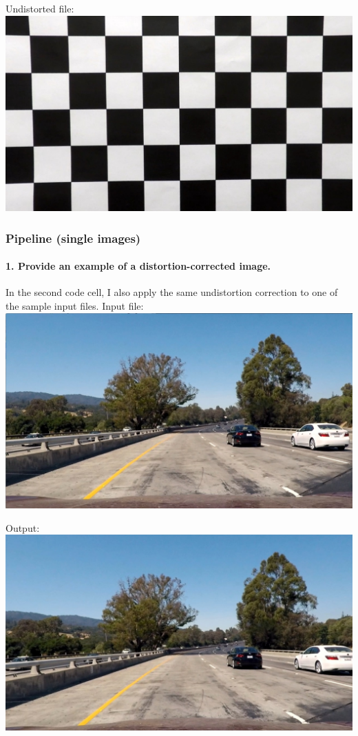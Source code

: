 \documentclass[11pt]{article}
\makeatletter
\def\maxwidth{\ifdim\Gin@nat@width>\linewidth\linewidth
    \else\Gin@nat@width\fi}
\let\Oldincludegraphics\includegraphics
\renewcommand{\includegraphics}[1]{\Oldincludegraphics[width=.8\maxwidth]{#1}}
\makeatother
\begin{document}
Undistorted file:
\includegraphics{./output_images/undistorted_checkerboard.jpg}

\hypertarget{pipeline-single-images}{%
\subsubsection{Pipeline (single images)}\label{pipeline-single-images}}

\hypertarget{provide-an-example-of-a-distortion-corrected-image.}{%
\paragraph{1. Provide an example of a distortion-corrected
image.}\label{provide-an-example-of-a-distortion-corrected-image.}}

In the second code cell, I also apply the same undistortion correction
to one of the sample input files. Input file:
\includegraphics{./test_images/test1.jpg}

Output: \includegraphics{./output_images/undistorted_test1.jpg}
\end{document}

